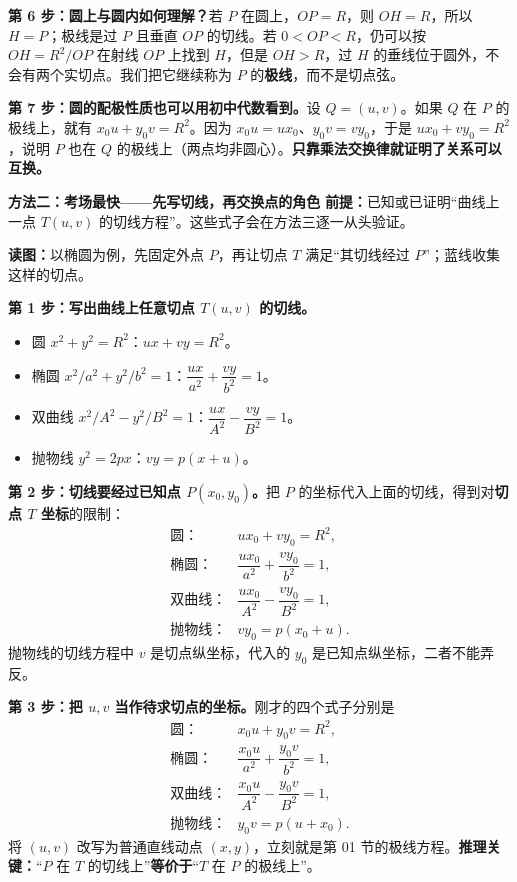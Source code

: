 \begin{proofbox}
\textbf{第 6 步：圆上与圆内如何理解？}若 $P$ 在圆上，$OP=R$，则 $OH=R$，所以 $H=P$；极线是过 $P$ 且垂直 $OP$ 的切线。若 $0<OP<R$，仍可以按 $OH=R^2/OP$ 在射线 $OP$ 上找到 $H$，但是 $OH>R$，过 $H$ 的垂线位于圆外，不会有两个实切点。我们把它继续称为 $P$ 的\textbf{极线}，而不是切点弦。

\textbf{第 7 步：圆的配极性质也可以用初中代数看到。}设 $Q=(u,v)$。如果 $Q$ 在 $P$ 的极线上，就有 $x_0u+y_0v=R^2$。因为 $x_0u=ux_0$、$y_0v=vy_0$，于是 $ux_0+vy_0=R^2$，说明 $P$ 也在 $Q$ 的极线上（两点均非圆心）。\textbf{只靠乘法交换律就证明了关系可以互换。}

\medskip
\begin{samepage}
\textbf{\textcolor{CProof}{方法二：考场最快——先写切线，再交换点的角色}}
\textbf{前提：}已知或已证明“曲线上一点 $T(u,v)$ 的切线方程”。这些式子会在方法三逐一从头验证。


\begin{center}\end{center}
\noindent\textbf{读图：}以椭圆为例，先固定外点 $P$，再让切点 $T$ 满足“其切线经过 $P$”；蓝线收集这样的切点。
\end{samepage}

\textbf{第 1 步：写出曲线上任意切点 $T(u,v)$ 的切线。}
\begin{itemize}[leftmargin=*,itemsep=0.25em]
\item 圆 $x^2+y^2=R^2$：$ux+vy=R^2$。
\item 椭圆 $x^2/a^2+y^2/b^2=1$：$\dfrac{ux}{a^2}+\dfrac{vy}{b^2}=1$。
\item 双曲线 $x^2/A^2-y^2/B^2=1$：$\dfrac{ux}{A^2}-\dfrac{vy}{B^2}=1$。
\item 抛物线 $y^2=2px$：$vy=p(x+u)$。
\end{itemize}

\textbf{第 2 步：切线要经过已知点 $P(x_0,y_0)$。}把 $P$ 的坐标代入上面的切线，得到对\textbf{切点 $T$ 坐标}的限制：
\[
\begin{array}{ll}
\text{圆：}&ux_0+vy_0=R^2,\\[0.2em]
\text{椭圆：}&\dfrac{ux_0}{a^2}+\dfrac{vy_0}{b^2}=1,\\[0.5em]
\text{双曲线：}&\dfrac{ux_0}{A^2}-\dfrac{vy_0}{B^2}=1,\\[0.5em]
\text{抛物线：}&vy_0=p(x_0+u).
\end{array}
\]
抛物线的切线方程中 $v$ 是切点纵坐标，代入的 $y_0$ 是已知点纵坐标，二者不能弄反。

\textbf{第 3 步：把 $u,v$ 当作待求切点的坐标。}刚才的四个式子分别是
\[
\begin{array}{ll}
\text{圆：}&x_0u+y_0v=R^2,\\[0.2em]
\text{椭圆：}&\dfrac{x_0u}{a^2}+\dfrac{y_0v}{b^2}=1,\\[0.5em]
\text{双曲线：}&\dfrac{x_0u}{A^2}-\dfrac{y_0v}{B^2}=1,\\[0.5em]
\text{抛物线：}&y_0v=p(u+x_0).
\end{array}
\]
将 $(u,v)$ 改写为普通直线动点 $(x,y)$，立刻就是第 01 节的极线方程。\textbf{推理关键：}“$P$ 在 $T$ 的切线上”\textbf{等价于}“$T$ 在 $P$ 的极线上”。


\end{proofbox}
